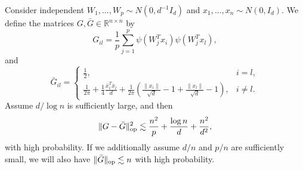\begin{lemma}\label{lem:lim-G-relu}
Consider independent $W_1,...,W_p\sim N(0,d^{-1}I_d)$ and $x_1,...,x_n\sim N(0,I_d)$. We define the matrices $G,\bar{G}\in\mathbb{R}^{n\times n}$ by
$$
G_{il}=\frac{1}{p}\sum_{j=1}^p\psi(W^T_jx_i)\psi(W_j^Tx_l),
$$
and
$$\bar{G}_{il}=\begin{cases}
\frac{1}{2}, & i=l, \\
\frac{1}{2\pi}+\frac{1}{4}\frac{\bar{x}_i^T\bar{x}_l}{d} + \frac{1}{2\pi}\left(\frac{\|x_i\|}{\sqrt{d}}-1+\frac{\|x_l\|}{\sqrt{d}}-1\right), & i\neq l.
\end{cases}$$
Assume $d/\log n$ is sufficiently large, and then
$$\|G-\bar{G}\|_{\rm op}^2\lesssim \frac{n^2}{p} + \frac{\log n}{d} + \frac{n^2}{d^2},$$
with high probability. If we additionally assume $d/n$ and $p/n$ are sufficiently small, we will also have $\|\bar{G}\|_{\rm op}\lesssim n$ with high probability.
\end{lemma}
